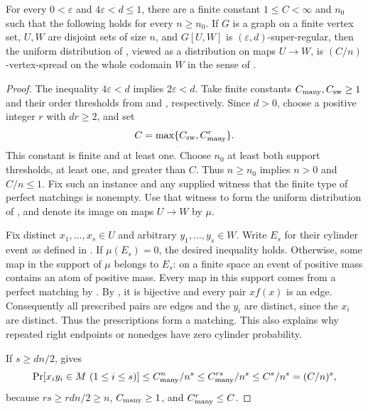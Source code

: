 \begin{lemma}
For every $0<\varepsilon$ and $4\varepsilon<d\leq1$, there are a finite constant $1\leq C<\infty$ and $n_0$ such that the following holds for every $n\geq n_0$. If $G$ is a graph on a finite vertex set, $U,W$ are disjoint sets of size $n$, and $G[U,W]$ is $(\varepsilon,d)$-super-regular, then the uniform distribution of , viewed as a distribution on maps $U\to W$, is $(C/n)$-vertex-spread on the whole codomain $W$ in the sense of .
\end{lemma}
\begin{proof}
The inequality $4\varepsilon<d$ implies $2\varepsilon<d$. Take finite
constants $C_{\rm many},C_{\rm sw}\geq1$ and their order thresholds from
 and , respectively.
Since $d>0$, choose a positive integer $r$ with $dr\geq2$, and set
\[
 C=\max\{C_{\rm sw},C_{\rm many}^r\}.
\]
This constant is finite and at least one. Choose $n_0$ at least both support
thresholds, at least one, and greater than $C$. Thus $n\geq n_0$ implies
$n>0$ and $C/n\leq1$. Fix such an instance and any supplied witness that
the finite type of perfect matchings is nonempty. Use that witness to form
the uniform distribution of , and denote
its image on maps $U\to W$ by $\mu$.

Fix distinct $x_1,\ldots,x_s\in U$ and arbitrary
$y_1,\ldots,y_s\in W$. Write $E_s$ for their cylinder event as defined in
. If $\mu(E_s)=0$, the desired inequality holds.
Otherwise, some map in the support of $\mu$ belongs to $E_s$: on a finite
space an event of positive mass contains an atom of positive mass. Every
map in this support comes from a perfect matching by
. By , it is
bijective and every pair $x f(x)$ is an edge. Consequently all prescribed
pairs are edges and the $y_i$ are distinct, since the $x_i$ are distinct.
Thus the prescriptions form a matching. This also explains why repeated
right endpoints or nonedges have zero cylinder probability.

If $s\geq dn/2$,  gives
\[
 \Pr[x_i y_i\in M\ (1\leq i\leq s)]\leq C_{\rm many}^{n}/n^s
 \leq C_{\rm many}^{rs}/n^s\leq C^s/n^s=(C/n)^s,
\]
because $rs\geq rdn/2\geq n$, $C_{\rm many}\geq1$, and
$C_{\rm many}^r\leq C$.


\end{proof}
